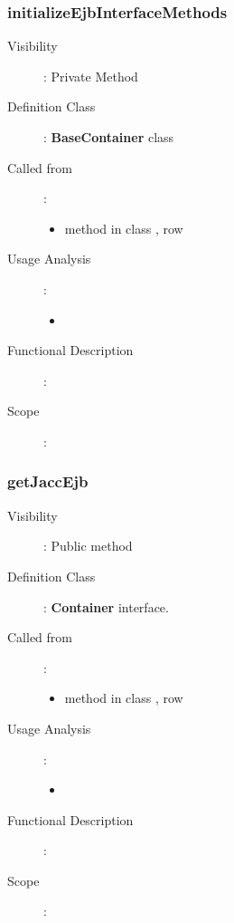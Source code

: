 \documentclass[11pt, a4paper,titlepage]{article}
\begin{document}
	 \subsubsection{initializeEjbInterfaceMethods}
	 \begin{description}
	 	\item[Visibility]: Private Method
	 	\item[Definition Class]: \textbf{BaseContainer} class
	 	\item[Called from]: 
	 	\begin{itemize}
	 		\item method \textbf{} in class \textbf{}, row \textbf{}
	 	\end{itemize}
	 	\item[Usage Analysis]: 
	 	\begin{itemize}
	 		\item 
	 	\end{itemize} 
	 	\item[Functional Description]:
	 	\item[Scope]: 
	 \end{description}
	 
	 \subsubsection{getJaccEjb}
	 \begin{description}
	 	\item[Visibility]: Public method
	 	\item[Definition Class]: \textbf{Container} interface.
	 	\item[Called from]: 
	 	\begin{itemize}
	 		\item method \textbf{} in class \textbf{}, row \textbf{}
	 	\end{itemize}
	 	\item[Usage Analysis]: 
	 	\begin{itemize}
	 		\item 
	 	\end{itemize} 
	 	\item[Functional Description]:
	 	\item[Scope]: 
	 \end{description}
\end{document}
